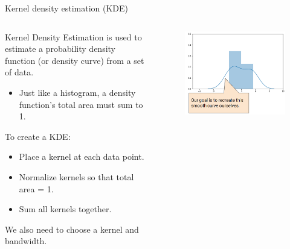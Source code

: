 \documentclass[aspectratio=169]{../latex_main/tntbeamer}  %
\begin{document}
	
	\begin{frame}{Kernel density estimation (KDE)}
	    \begin{columns}
	        \begin{column}{.5\textwidth}
	            	    Kernel Density Estimation is used to estimate a probability density function (or density curve) from a set of data.

	               \begin{itemize}
	                   \item Just like a histogram, a density function’s total area must sum to 1.
	               \end{itemize}
	               To create a KDE:
	               \begin{itemize}
	                   \item Place a kernel at each data point.
	                   \item Normalize kernels so that total area = 1.
	                   \item Sum all kernels together.
	               \end{itemize}
	               We also need to choose a kernel and bandwidth.
	        \end{column}
	        
	        
	        \begin{column}{.5\textwidth}
	                \begin{figure}
	                    \centering
	                    \includegraphics[scale=.4]{Bild84}
	                \end{figure}
	        \end{column}
	    \end{columns}
	\end{frame}
	
\end{document}
